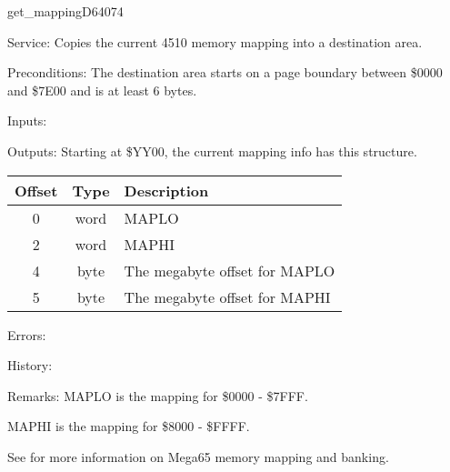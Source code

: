 \newpage
\begin{hyppotrap}{get\_mapping}{D640}{74}
\item [Service:]
  Copies the current 4510 memory mapping into a destination area.
\item [Preconditions:]
  The destination area starts on a page boundary between \$0000 and \$7E00 and
  is at least 6 bytes.
\item [Inputs:]
\item [Outputs:]
  Starting at \$YY00, the current mapping info has this structure.
  {\setlength{\tabcolsep}{2mm}
  \begin{tabular}{|c|c|p{6.9cm}|}
  \hline
  \textbf{Offset} & \textbf{Type} & \textbf{Description} \\
  \hline
  0 & word & MAPLO \\
  2 & word & MAPHI \\
  4 & byte & The megabyte offset for MAPLO \\
  5 & byte & The megabyte offset for MAPHI \\
  \hline
  \end{tabular}
  }
\item [Errors:]
\item [History:]
\item [Remarks:]
  MAPLO is the mapping for \$0000 - \$7FFF.

  MAPHI is the mapping for \$8000 - \$FFFF.

  See \TODO{} for more information on Mega65 memory mapping and banking.
\end{hyppotrap}


